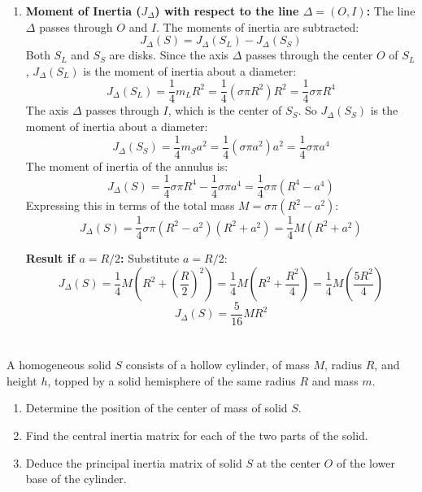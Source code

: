 \documentclass[12pt]{article}
\begin{document}
\begin{correctionbox}
\begin{enumerate}
    \item \textbf{Moment of Inertia ($J_{\Delta}$) with respect to the line $\Delta = (O, I)$:}
        The line $\Delta$ passes through $O$ and $I$. The moments of inertia are subtracted:
        $$J_{\Delta}(S) = J_{\Delta}(S_L) - J_{\Delta}(S_S)$$
        Both $S_L$ and $S_S$ are disks. Since the axis $\Delta$ passes through the center $O$ of $S_L$, $J_{\Delta}(S_L)$ is the moment of inertia about a diameter:
        $$J_{\Delta}(S_L) = \frac{1}{4} m_L R^2 = \frac{1}{4} (\sigma \pi R^2) R^2 = \frac{1}{4} \sigma \pi R^4$$
        The axis $\Delta$ passes through $I$, which is the center of $S_S$. So $J_{\Delta}(S_S)$ is the moment of inertia about a diameter:
        $$J_{\Delta}(S_S) = \frac{1}{4} m_S a^2 = \frac{1}{4} (\sigma \pi a^2) a^2 = \frac{1}{4} \sigma \pi a^4$$
        The moment of inertia of the annulus is:
        $$J_{\Delta}(S) = \frac{1}{4} \sigma \pi R^4 - \frac{1}{4} \sigma \pi a^4 = \frac{1}{4} \sigma \pi (R^4 - a^4)$$
        Expressing this in terms of the total mass $M=\sigma \pi (R^2-a^2)$:
        $$J_{\Delta}(S) = \frac{1}{4} \sigma \pi (R^2 - a^2)(R^2 + a^2) = \frac{1}{4} M (R^2 + a^2)$$

    \textbf{Result if $a = R/2$:}
        Substitute $a=R/2$:
        $$J_{\Delta}(S) = \frac{1}{4} M \left(R^2 + \left(\frac{R}{2}\right)^2\right) = \frac{1}{4} M \left(R^2 + \frac{R^2}{4}\right) = \frac{1}{4} M \left(\frac{5R^2}{4}\right)$$
        $$J_{\Delta}(S) = \frac{5}{16} M R^2$$
\end{enumerate}

\end{correctionbox}

\section{}

A homogeneous solid $S$ consists of a hollow cylinder, of mass $M$, radius $R$, and height $h$, topped by a solid hemisphere of the same radius $R$ and mass $m$.

\begin{enumerate}
    \item Determine the position of the center of mass of solid $S$.
    \item Find the central inertia matrix for each of the two parts of the solid.
    \item Deduce the principal inertia matrix of solid $S$ at the center $O$ of the lower base of the cylinder.
\end{enumerate}
\end{document}
